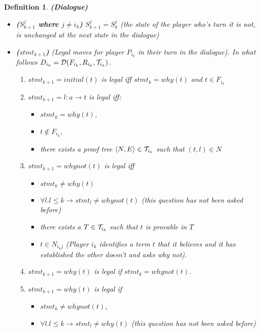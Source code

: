 \documentclass{blue-book}
\newtheorem{definition}{Definition}
\newcommand{\drule}[3]{\ensuremath{#1:#2 \rightarrow #3}}
\newcommand{\node}[2]{\ensuremath{(#1, #2)}}
\newcommand{\edge}[2]{\ensuremath{#1 \mapsto #2}}
\newcommand{\deduction}[3]{\ensuremath{{\cal D}(#1, #2, #3)}}
\begin{document}
\begin{definition}{\bf (Dialogue)}
\begin{itemize}
\item {\bf ($S^j_{k+1}$ where $j \neq i_k$)} $S^j_{k+1} = S^j_{k}$ (the state of the player who's turn it is not, is unchanged at the next state in the dialogue)

\item {\bf ($stmt_{k+1}$)} (Legal  moves for player $P_{i_k}$ in their turn in the dialogue). In what follows $D_{i_k} = \deduction{F_{i_k}}{R_{i_k}}{{\cal  T}_{i_k}}$.

\begin{enumerate}
\item $stmt_{k + 1} = initial(t)$ is legal iff $stmt_{k} = why(t)$ and $t \in F_{i_k}$
\item $stmt_{k + 1} = \drule{l}{a}{t}$ is legal iff:
\begin{itemize}
\item$stmt_{k} = why(t)$, 
\item $t \not\in F_{i_k}$,
\item there exists a proof tree $\langle N, E\rangle \in {\cal T}_{i_k}$ such that $\node{t}{l} \in N$
\end{itemize}
\item $stmt_{k + 1} = whynot(t)$ is legal iff 
\begin{itemize}
\item $stmt_{k} \neq why(t)$
\item $\forall l. l \leq k \rightarrow stmt_{l} \neq whynot(t)$ (this question has not been asked before)
\item there exists a $T \in {\cal T}_{i_k}$ such that $t$ is provable in $T$
\item $t \in N_{{i_k}j}$  (Player ${i_k}$ identifies a term $t$ that it believes and it has established the other doesn't  and asks why not).
\end{itemize}
\item $stmt_{k + 1} = why(t)$ is legal if $stmt_{k} =  whynot(t)$.
\item $stmt_{k + 1} = why(t)$ is legal if 
\begin{itemize}
\item $stmt_{k} \neq whynot(t)$,
\item $\forall l. l \leq k \rightarrow stmt_{l} \neq why(t)$ (this question has not been asked before)

\end{itemize}
\end{enumerate}
\end{itemize}
\end{definition}
\end{document}
